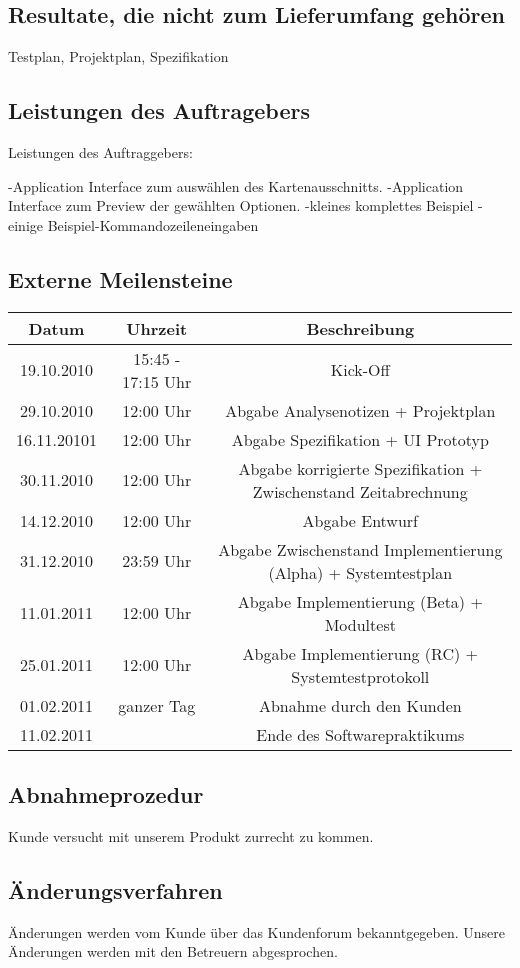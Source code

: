 \documentclass[a4paper,10pt]{scrartcl}
\begin{document}
\subsection{Resultate, die nicht zum Lieferumfang gehören}
Testplan, Projektplan, Spezifikation
\subsection{Leistungen des Auftragebers}
Leistungen des Auftraggebers:

-Application Interface zum auswählen des Kartenausschnitts.
-Application Interface zum Preview der gewählten Optionen.
-kleines komplettes Beispiel
-einige Beispiel-Kommandozeileneingaben
\subsection{Externe Meilensteine}
\begin{tabular}{|c|c|c|}
\hline Datum & Uhrzeit & Beschreibung\\ 
\hline 19.10.2010 & 15:45 - 17:15 Uhr & Kick-Off\\ 
\hline 29.10.2010 & 12:00 Uhr & Abgabe Analysenotizen + Projektplan\\ 
\hline 16.11.20101 & 12:00 Uhr & Abgabe Spezifikation + UI Prototyp\\ 
\hline 30.11.2010 & 12:00 Uhr & Abgabe korrigierte Spezifikation + Zwischenstand Zeitabrechnung\\ 
\hline 14.12.2010 & 12:00 Uhr & Abgabe Entwurf\\ 
\hline 31.12.2010 & 23:59 Uhr & Abgabe Zwischenstand Implementierung (Alpha) + Systemtestplan\\ 
\hline 11.01.2011 & 12:00 Uhr & Abgabe Implementierung (Beta) + Modultest\\ 
\hline 25.01.2011 & 12:00 Uhr & Abgabe Implementierung (RC) + Systemtestprotokoll\\ 
\hline 01.02.2011 & ganzer Tag & Abnahme durch den Kunden\\ 
\hline 11.02.2011 & & Ende des Softwarepraktikums\\ 
\hline 
\end{tabular} 
\subsection{Abnahmeprozedur}
Kunde versucht mit unserem Produkt zurrecht zu kommen.
\subsection{Änderungsverfahren}
Änderungen werden vom Kunde über das Kundenforum bekanntgegeben. Unsere Änderungen werden mit den Betreuern abgesprochen.
\end{document}
